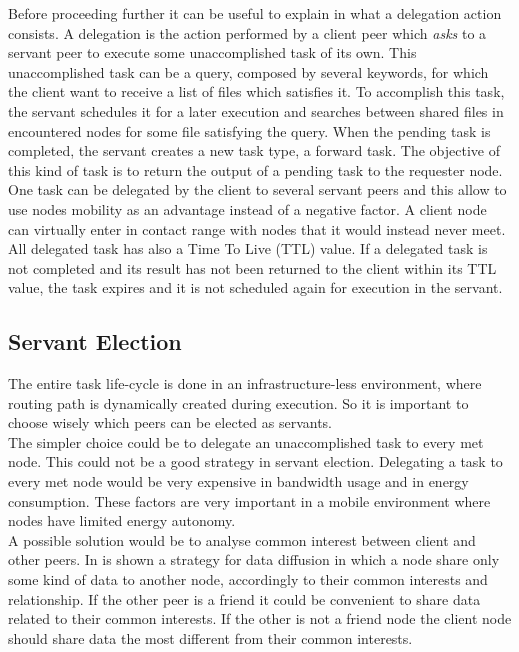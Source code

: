 Before proceeding further it can be useful to explain in what a delegation action consists. A delegation is the action performed by a client peer which \textit{asks} to a servant peer to execute some unaccomplished task of its own. This unaccomplished task can be a query, composed by several keywords, for which the client want to receive a list of files which satisfies it. To accomplish this task, the servant schedules it for a later execution and searches between shared files in encountered nodes for some file satisfying the query. When the pending task is completed, the servant creates a new task type, a forward task. The objective of this kind of task is to return the output of a pending task to the requester node.
\\
One task can be delegated by the client to several servant peers and this allow to use nodes mobility as an advantage instead of a negative factor. A client node can virtually enter in contact range with nodes that it would instead never meet. 
\\

All delegated task has also a Time To Live (TTL) value. If a delegated task is not completed and its result has not been returned to the client within its TTL value, the task expires and it is not scheduled again for execution in the servant.
\\

\subsection{Servant Election}
The entire task life-cycle is done in an infrastructure-less environment, where routing path is dynamically created during execution. So it is important to choose wisely which peers can be elected as servants.
\\

The simpler choice could be to delegate an unaccomplished task to every met node. This could not be a good strategy in servant election. Delegating a task to every met node would be very expensive in bandwidth usage and in energy consumption. These factors are very important in a mobile environment where nodes have limited energy autonomy. 
\\

A possible solution would be to analyse common interest between client and other peers. In \cite{socialNetworks} is shown a strategy for data diffusion in which a node share only some kind of data to another node, accordingly to their common interests and relationship. If the other peer is a friend it could be convenient to share data related to their common interests. If the other is not a friend node the client node should share data the most different from their common interests.
\\

